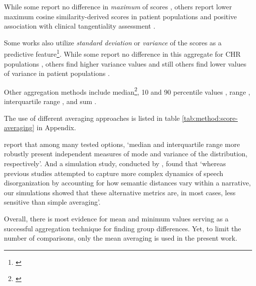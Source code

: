 While some report no difference in \textit{maximum} of scores \citep{haas2020linking, morgan2021natural, voppel2021quantified, bilgrami2022construct}, others report lower maximum cosine similarity-derived scores in patient populations \citep{corcoran2018prediction, panicheva2019semantic, ryazanskaya2020thesis, corona2022assessing} and positive association with clinical tangentiality assessment \citep{bilgrami2022construct}.

Some works also utilize \textit{standard deviation} or \textit{variance} of the scores as a predictive feature\footnote{\cite{bedi2015automated, corcoran2018prediction, panicheva2019semantic, haas2020linking, hitczenko2021understanding, sarzynska2021detecting, voppel2021quantified, corona2022assessing, voppel2023semantic}}. While some report no difference in this aggregate for CHR populations \citep{haas2020linking, hitczenko2021understanding}, others find higher variance values \citep{voppel2021quantified, voppel2023semantic} and still others find lower values of variance in patient populations \citep{corcoran2018prediction}.

Other aggregation methods include median\footnote{\cite{bedi2015automated, sarzynska2021detecting, corona2022assessing, parola2022speech}}, 10 and 90 percentile values \citep{corcoran2018prediction, panicheva2019semantic}, range \citep{corona2022assessing}, interquartile range \citep{parola2022speech}, and sum \citep{jeong2023exploring}.

The use of different averaging approaches is listed in table \ref{tab:method:score-averaging} in Appendix.

\citet{parola2022speech} report that among many tested options, `median and interquartile range more robustly present independent measures of mode and variance of the distribution, respectively'. And a simulation study, conducted by \citet{fradkin2023theory}, found that `whereas previous studies attempted to capture more complex dynamics of speech disorganization by accounting for how semantic distances vary within a narrative, our simulations showed that these alternative metrics are, in most cases, less sensitive than simple averaging'. 

Overall, there is most evidence for mean and minimum values serving as a successful aggregation technique for finding group differences. Yet, to limit the number of comparisons, only the mean averaging is used in the present work.

